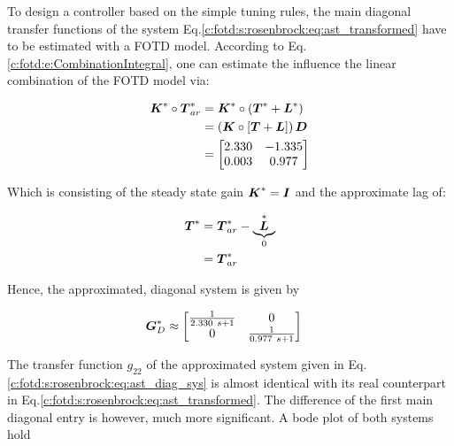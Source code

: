 To design a controller based on the simple tuning rules, the main diagonal transfer functions of the system Eq.\ref{c:fotd:s:rosenbrock:eq:ast_transformed} have to be estimated with a FOTD model. According to Eq. \ref{c:fotd:e:CombinationIntegral}, one can estimate the influence the linear combination of the FOTD model via:

\begin{align}
\begin{split}
\mbox{\boldmath$K$}^* \circ \mbox{\boldmath$T$}_{ar}^{*} &= \mbox{\boldmath$K$}^* \circ \left( \mbox{\boldmath$T$}^* + \mbox{\boldmath$L$}^* \right)\\
&=  \left( \mbox{\boldmath$K$} \circ \left[ \mbox{\boldmath$T$} + \mbox{\boldmath$L$} \right] \right) \mbox{\boldmath$D$} \\
&= \begin{bmatrix} 
2.330 & -1.335 \\ 
0.003 & 0.977	
\end{bmatrix}
\end{split}
\label{c:fotd:s:rosenbrock:eq:ast_approx}
\end{align}


Which is consisting of the steady state gain $\mbox{\boldmath$K$}^* = \mbox{\boldmath$I$}$ and the approximate lag of:

\begin{align}
\begin{split}
\mbox{\boldmath$T$}^* & = \mbox{\boldmath$T$}_{ar}^* - \underbrace{{\mbox{\boldmath$L$}}}_{0}^* \\
&= \mbox{\boldmath$T$}_{ar}^*
\end{split}
\label{c:fotd:s:rosenbrock:eq:ast_lag_approx}
\end{align}

Hence, the approximated, diagonal system is given by 

\begin{align}
\begin{split}
\mbox{\boldmath$G$}_D^* &\approx \begin{bmatrix}
\frac{1}{2.330~s+1} & 0 \\
0 & \frac{1}{0.977~s+1}
\end{bmatrix}
\end{split}
\label{c:fotd:s:rosenbrock:eq:ast_diag_sys}
\end{align}

The transfer function $g_{22}$ of the approximated system given in Eq.\ref{c:fotd:s:rosenbrock:eq:ast_diag_sys} is almost identical with its real counterpart in Eq.\ref{c:fotd:s:rosenbrock:eq:ast_transformed}. The difference of the first main diagonal entry is however, much more significant. A bode plot of both systems hold\\

